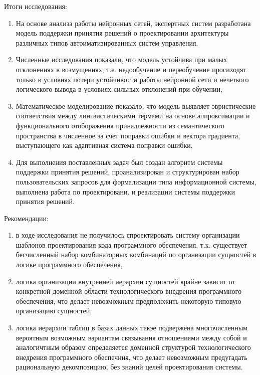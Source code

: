 
Итоги исследования:
\begin{enumerate}
  \item На основе анализа работы нейронных сетей, экспертных систем разработана модель поддержки принятия решений о проектировании архитектуры различных типов автоиматизированных систем управления,
  \item Численные исследования показали, что модель устойчива при малых отклонениях в возмущениях, т.е. недообучение и переобучение просиходят только в условиях потери устойчивости работы нейронной сети и нечеткого логического вывода в условиях сильных отклонений при обучении,
  \item Математическое моделирование показало, что модель выявляет эвристические соответствия между лингвистическими термами на основе аппроксимации и функционального отоборажения принадлежности из семантического пространства в численное за счет поправки ошибки и вектора градиента, выступающего как адаптивная система поправки ошибки,
  \item Для выполнения поставленных задач был создан алгоритм системы поддержки принятия решений, проанализирован и структурирован набор пользовательских запросов для формализации типа информационной системы, выполнена работа по проектировани. и реализации системы поддержки принятия решений.
\end{enumerate}

Рекомендации:
\begin{enumerate}
  \item в ходе исследования не получилось спроектировать систему организации шаблонов проектирования кода программного обеспечения, т.к. существует бесчисленный набор комбинаторных комбинаций по организации сущностей в логике программного обеспечения, 
  \item логика организации внутренней иерархии сущностей крайне зависит от конкретной доменной области технологического внедрения программного обеспечения, что делает невозможным предположить некоторую типовую организацию сущностей,
  \item логика иерархии таблиц в базах данных такэе подвержена многочисленным вероятным возможным вариантам связывания отношениями между собой и аналогичтным образом определяется доменной структурой технологического внедрения программного обеспечния, что делает невозможным предугадать рациональную декомпозицию, без знаний целей проектирования системы.
\end{enumerate}

